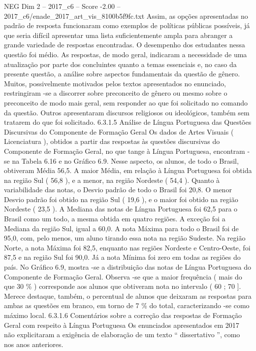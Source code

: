 \begin{textsample}{NEG Dim 2 – 2017\_c6 – Score -2.00 – 2017\_c6/enade\_2017\_art\_vis\_8100b5f9fc.txt}
Assim, as opções apresentadas no padrão de resposta funcionaram como exemplos de políticas públicas possíveis, já que seria difícil apresentar uma lista suficientemente ampla para abranger a grande variedade de respostas encontradas.
O desempenho dos estudantes nessa questão foi médio.
As respostas, de modo geral, indicaram a necessidade de uma atualização por parte dos concluintes quanto a temas essenciais e, no caso da presente questão, a análise sobre aspectos fundamentais da questão de gênero.
Muitos, possivelmente motivados pelos textos apresentados no enunciado, restringiram -se a discorrer sobre preconceito de gênero ou mesmo sobre o preconceito de modo mais geral, sem responder ao que foi solicitado no comando da questão.
Outros apresentaram discursos religiosos ou ideológicos, também sem tratarem do que foi solicitado. 6.3.1.5 Análise de Língua Portuguesa das Questões Discursivas do Componente de Formação Geral Os dados de Artes Visuais ( Licenciatura ), obtidos a partir das respostas às questões discursivas do Componente de Formação Geral, no que tange à Língua Portuguesa, encontram -se na Tabela 6.16 e no Gráfico 6.9.
Nesse aspecto, os alunos, de todo o Brasil, obtiveram Média 56,5.
A maior Média, em relação à Língua Portuguesa foi obtida na região Sul ( 56,8 ), e a menor, na região Nordeste ( 54,4 ).
Quanto à variabilidade das notas, o Desvio padrão de todo o Brasil foi 20,8.
O menor Desvio padrão foi obtido na região Sul ( 19,6 ), e o maior foi obtido na região Nordeste ( 23,5 ).
A Mediana das notas de Língua Portuguesa foi 62,5 para o Brasil como um todo, a mesma obtida em quatro regiões.
A exceção foi a Mediana da região Sul, igual a 60,0.
A nota Máxima para todo o Brasil foi de 95,0, com, pelo menos, um aluno tirando essa nota na região Sudeste.
Na região Norte, a nota Máxima foi 82,5, enquanto nas regiões Nordeste e Centro-Oeste, foi 87,5 e na região Sul foi 90,0.
Já a nota Mínima foi zero em todas as regiões do país.
No Gráfico 6.9, mostra -se a distribuição das notas de Língua Portuguesa do Componente de Formação Geral.
Observa -se que a maior frequência ( mais do que 30 \% ) corresponde aos alunos que obtiveram nota no intervalo ( 60 ; 70 ].
Merece destaque, também, o percentual de alunos que deixaram as respostas para ambas as questões em branco, em torno de 7 \% do total, caracterizando -se como máximo local. 6.3.1.6 Comentários sobre a correção das respostas de Formação Geral com respeito à Língua Portuguesa Os enunciados apresentados em 2017 não explicitaram a exigência de elaboração de um texto “ dissertativo ”, como nos anos anteriores.

\end{textsample}
